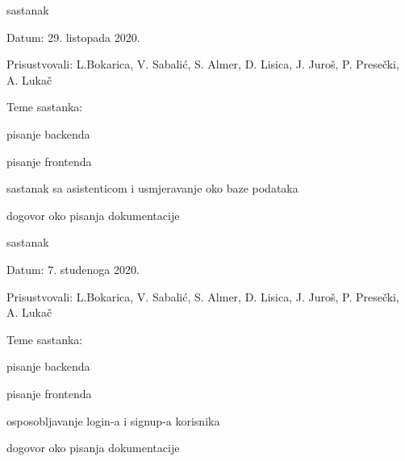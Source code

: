 \begin{packed_enum}
			\item  sastanak
			\item[] \begin{packed_item}
				\item Datum: 29. listopada 2020.
				\item Prisustvovali: L.Bokarica, V. Sabalić, S. Almer, D. Lisica, J. Juroš, P. Presečki, A. Lukač
				\item Teme sastanka:
				\begin{packed_item}
					\item  pisanje backenda
					\item pisanje frontenda
					\item  sastanak sa asistenticom i usmjeravanje oko baze podataka
					\item dogovor oko pisanja dokumentacije
				\end{packed_item}
			\end{packed_item}
		
				\item  sastanak
			\item[] \begin{packed_item}
				\item Datum: 7. studenoga 2020.
				\item Prisustvovali: L.Bokarica, V. Sabalić, S. Almer, D. Lisica, J. Juroš, P. Presečki, A. Lukač
				\item Teme sastanka:
				\begin{packed_item}
					\item  pisanje backenda
					\item pisanje frontenda
					\item osposobljavanje login-a i signup-a korisnika
					\item  dogovor oko pisanja dokumentacije
				\end{packed_item}
			\end{packed_item}
		

\end{packed_enum}
